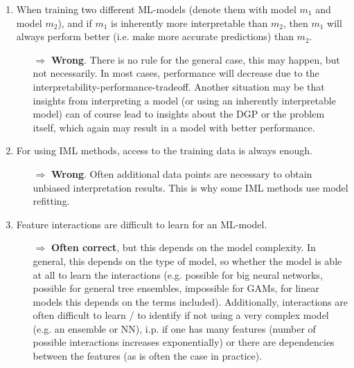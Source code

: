 \begin{enumerate}
    	\item When training two different ML-models (denote them with model \(m_1\) and model $m_2$), and if $m_1$ is inherently more interpretable than \(m_2\), then $m_1$ will always perform better (i.e. make more accurate predictions) than $m_2$.
    	\begin{itemize}
    		\item[$\Rightarrow$] \textbf{Wrong}. There is no rule for the general case, this may happen, but not necessarily. In most cases, performance will decrease due to the interpretability-performance-tradeoff. Another situation may be that insights from interpreting a model (or using an inherently interpretable model) can of course lead to insights about the DGP or the problem itself, which again may result in a model with better performance.
    	\end{itemize}

    	\item For using IML methods, access to the training data is always enough.
    	\begin{itemize}
    		\item[$\Rightarrow$] \textbf{Wrong}. Often additional data points are necessary to obtain unbiased interpretation results. This is why some IML methods use model refitting.
    	\end{itemize}

    	\item %
        Feature interactions are difficult to learn for an ML-model.
    	\begin{itemize}
    		\item[$\Rightarrow$] \textbf{Often correct}, but this depends on the model complexity. In general, this depends on the type of model, so whether the model is able at all to learn the interactions (e.g. possible for big neural networks, possible for general tree ensembles, impossible for GAMs, for linear models this depends on the terms included). Additionally, interactions are often difficult to learn / to identify if not using a very complex model (e.g. an ensemble or NN), i.p. if one has many features (number of possible interactions increases exponentially) or there are dependencies between the features (as is often the case in practice).
    	\end{itemize}


\end{enumerate}
